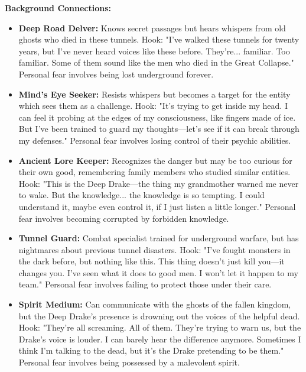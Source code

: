 \documentclass[11pt]{article}
\begin{document}
\textbf{Background Connections:}
\begin{itemize}
\item \textbf{Deep Road Delver:} Knows secret passages but hears whispers from old ghosts who died in these tunnels. Hook: "I've walked these tunnels for twenty years, but I've never heard voices like these before. They're... familiar. Too familiar. Some of them sound like the men who died in the Great Collapse." Personal fear involves being lost underground forever.
\item \textbf{Mind's Eye Seeker:} Resists whispers but becomes a target for the entity which sees them as a challenge. Hook: "It's trying to get inside my head. I can feel it probing at the edges of my consciousness, like fingers made of ice. But I've been trained to guard my thoughts—let's see if it can break through my defenses." Personal fear involves losing control of their psychic abilities.
\item \textbf{Ancient Lore Keeper:} Recognizes the danger but may be too curious for their own good, remembering family members who studied similar entities. Hook: "This is the Deep Drake—the thing my grandmother warned me never to wake. But the knowledge... the knowledge is so tempting. I could understand it, maybe even control it, if I just listen a little longer." Personal fear involves becoming corrupted by forbidden knowledge.
\item \textbf{Tunnel Guard:} Combat specialist trained for underground warfare, but has nightmares about previous tunnel disasters. Hook: "I've fought monsters in the dark before, but nothing like this. This thing doesn't just kill you—it changes you. I've seen what it does to good men. I won't let it happen to my team." Personal fear involves failing to protect those under their care.
\item \textbf{Spirit Medium:} Can communicate with the ghosts of the fallen kingdom, but the Deep Drake's presence is drowning out the voices of the helpful dead. Hook: "They're all screaming. All of them. They're trying to warn us, but the Drake's voice is louder. I can barely hear the difference anymore. Sometimes I think I'm talking to the dead, but it's the Drake pretending to be them." Personal fear involves being possessed by a malevolent spirit.
\end{itemize}
\end{document}
